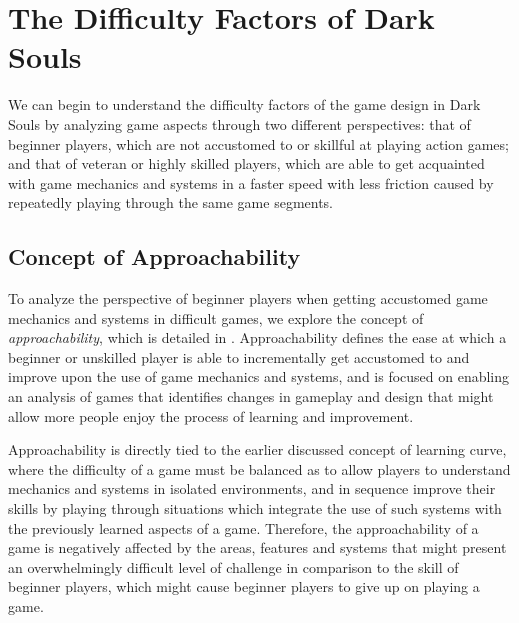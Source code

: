 \section{The Difficulty Factors of Dark Souls}
\label{sec:pain-points-dark-souls}


We can begin to understand the difficulty factors of the game design in Dark Souls by analyzing game aspects through two different perspectives: that of beginner players, which are not accustomed to or skillful at playing action games; and that of veteran or highly skilled players, which are able to get acquainted with game mechanics and systems in a faster speed with less friction caused by repeatedly playing through the same game segments.

\subsection{Concept of Approachability}

To analyze the perspective of beginner players when getting accustomed game mechanics and systems in difficult games, we explore the concept of \emph{approachability}, which is detailed in \cite{ONLINE_AcessibilityInGameDesign}. Approachability defines the ease at which a beginner or unskilled player is able to incrementally get accustomed to and improve upon the use of game mechanics and systems, and is focused on enabling an analysis of games that identifies changes in gameplay and design that might allow more people enjoy the process of learning and improvement.

Approachability is directly tied to the earlier discussed concept of learning curve, where the difficulty of a game must be balanced as to allow players to understand mechanics and systems in isolated environments, and in sequence improve their skills by playing through situations which integrate the use of such systems with the previously learned aspects of a game. Therefore, the approachability of a game is negatively affected by the areas, features and systems that might present an overwhelmingly difficult level of challenge in comparison to the skill of beginner players, which might cause beginner players to give up on playing a game.

